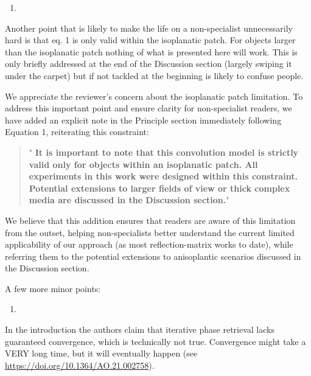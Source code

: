 \documentclass[12pt]{article}
\newenvironment{solved_reviewercomment}
    {\begin{tcolorbox}[width=\linewidth,colback=gray!5,colframe=solved_commentcolor!50,title=Reviewer Comment,left=5pt,right=5pt]}
    {\end{tcolorbox}}
\newenvironment{finished_ourresponse}
    {\begin{tcolorbox}[width=\linewidth,breakable,enhanced,colback=gray!5,colframe=finished_responsecolor!50,title=Response,left=5pt,right=5pt]}
    {\end{tcolorbox}}
\begin{document}
\begin{enumerate}[label=\arabic*., resume]
\item \leavevmode
\end{enumerate}
\vspace{-1em}
\begin{solved_reviewercomment}
    Another point that is likely to make the life on a non-specialist unnecessarily hard is that eq. 1 is only valid within the isoplanatic patch. For objects larger than the isoplanatic patch nothing of what is presented here will work. This is only briefly addressed at the end of the Discussion section (largely swiping it under the carpet) but if not tackled at the beginning is likely to confuse people.
    
\end{solved_reviewercomment}

\begin{finished_ourresponse}
    We appreciate the reviewer's concern about the isoplanatic patch limitation. To address this important point and ensure clarity for non-specialist readers, we have added an explicit note in the Principle section immediately following Equation 1, reiterating this constraint:
    \begin{quote}
        "{\bfseries
        It is important to note that this convolution model is strictly valid only for objects within an isoplanatic patch. All experiments in this work were designed within this constraint. Potential extensions to larger fields of view or thick complex media are discussed in the Discussion section.}"
    \end{quote}
            
    
    We believe that this addition ensures that readers are aware of this limitation from the outset, helping non-specialists better understand the current limited applicability of our approach (as most reflection-matrix works to date), while referring them to the potential extensions to anisoplantic scenarios discussed in the  Discussion section.
\end{finished_ourresponse}



A few more minor points:

\begin{enumerate}[label=\arabic*., resume]
\item \leavevmode
\end{enumerate}
\vspace{-1em}
\begin{solved_reviewercomment}
    In the introduction the authors claim that iterative phase retrieval lacks guaranteed convergence, which is technically not true. Convergence might take a VERY long time, but it will eventually happen (see \url{https://doi.org/10.1364/AO.21.002758}).
\end{solved_reviewercomment}
\end{document}
